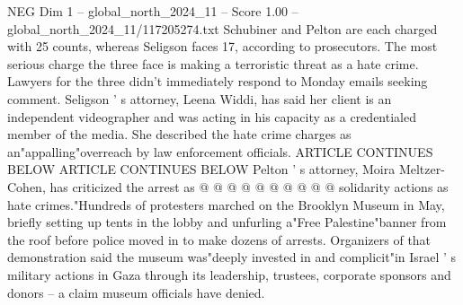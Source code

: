 \begin{textsample}{NEG Dim 1 – global\_north\_2024\_11 – Score 1.00 – global\_north\_2024\_11/117205274.txt}
Schubiner and Pelton are each charged with 25 counts, whereas Seligson faces 17, according to prosecutors.
The most serious charge the three face is making a terroristic threat as a hate crime.
Lawyers for the three didn't immediately respond to Monday emails seeking comment.
Seligson ' s attorney, Leena Widdi, has said her client is an independent videographer and was acting in his capacity as a credentialed member of the media.
She described the hate crime charges as an"appalling"overreach by law enforcement officials.
ARTICLE CONTINUES BELOW ARTICLE CONTINUES BELOW Pelton ' s attorney, Moira Meltzer-Cohen, has criticized the arrest as @ @ @ @ @ @ @ @ @ @ solidarity actions as hate crimes."Hundreds of protesters marched on the Brooklyn Museum in May, briefly setting up tents in the lobby and unfurling a"Free Palestine"banner from the roof before police moved in to make dozens of arrests.
Organizers of that demonstration said the museum was"deeply invested in and complicit"in Israel ' s military actions in Gaza through its leadership, trustees, corporate sponsors and donors -- a claim museum officials have denied.

\end{textsample}
